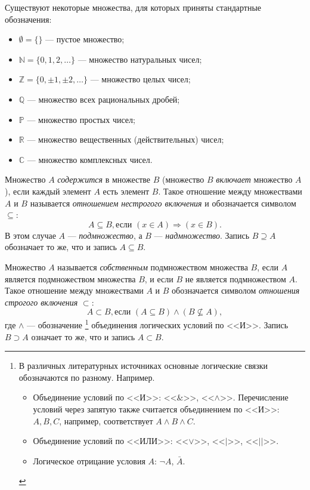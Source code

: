 Существуют некоторые множества, для которых приняты стандартные обозначения:
\begin{itemize}
    \item $\emptyset=\{\}$ --- пустое множество;
    \item $\mathbb{N}=\{0,1,2,\ldots\}$ --- множество натуральных чисел;
    \item $\mathbb{Z}=\{0,\pm 1,\pm 2,\ldots\}$ --- множество целых чисел;
    \item $\mathbb{Q}$ --- множество всех рациональных дробей;
    \item $\mathbb{P}$ --- множество простых чисел;
    \item $\mathbb{R}$ --- множество вещественных (действительных) чисел;
    \item $\mathbb{C}$ --- множество комплексных чисел.
\end{itemize}

Множество $A$ \emph{содержится} в множестве $B$ (множество $B$ \emph{включает} множество $A$), если каждый элемент $A$ есть элемент $B$. Такое отношение между множествами $A$ и $B$ называется \emph{отношением нестрогого включения} и обозначается символом $\subseteq$:
\[A\subseteq B, \text{если\ } (x\in A)\Rightarrow (x\in B).\]
В этом случае $A$ --- \emph{подмножество}, а $B$ --- \emph{надмножество}. Запись $B\supseteq A$ обозначает то же, что и запись $A\subseteq B$.

Множество $A$ называется \emph{собственным} подмножеством множества $B$, если $A$ является подмножеством множества $B$, и если $B$ не является подмножеством $A$. Такое отношение между множествами $A$ и $B$ обозначается символом \emph{отношения строгого включения} $\subset$:
\[A\subset B,\text{если $(A\subseteq B)\land(B\not\subseteq A)$},\]
где $\land$ --- обозначение
\footnote{
    В различных литературных источниках основные логические связки обозначаются по разному. Например.
    \begin{itemize}
        \item Объединение условий по <<И>>: <<$\&$>>, <<$\land$>>. Перечисление условий через запятую также считается объединением по <<И>>:$A,B,C$, например, соответствует $A\land B\land C$.
        \item Объединение условий по <<ИЛИ>>: <<$\lor$>>, <<$|$>>, <<$||$>>.
        \item Логическое отрицание условия $A$: $\lnot A$, $\bar{A}$.
    \end{itemize}
} объединения логических условий по <<И>>. Запись $B\supset A$ означает то же, что и запись $A\subset B$.
  
